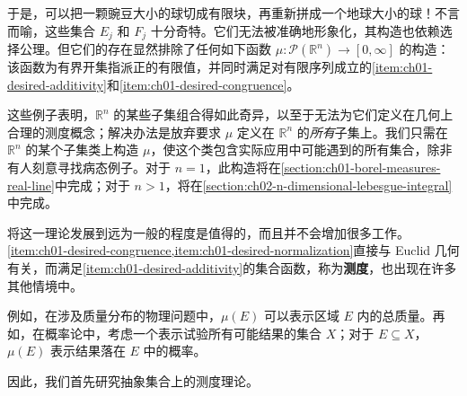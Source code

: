 \documentclass[../../main.tex]{subfiles}%
\begin{document}

\begin{remark}
于是，可以把一颗豌豆大小的球切成有限块，再重新拼成一个地球大小的球！不言而喻，这些集合 $E_j$ 和 $F_j$ 十分奇特。它们无法被准确地形象化，其构造也依赖选择公理。但它们的存在显然排除了任何如下函数 $\mu:\mathscr{P}(\mathbb{R}^n)\to[0,\infty]$ 的构造：该函数为有界开集指派正的有限值，并同时满足对有限序列成立的\cref{item:ch01-desired-additivity}和\cref{item:ch01-desired-congruence}。
\end{remark}


这些例子表明，$\mathbb{R}^n$ 的某些子集组合得如此奇异，以至于无法为它们定义在几何上合理的测度概念；解决办法是放弃要求 $\mu$ 定义在 $\mathbb{R}^n$ 的\emph{所有}子集上。我们只需在 $\mathbb{R}^n$ 的某个子集类上构造 $\mu$，使这个类包含实际应用中可能遇到的所有集合，除非有人刻意寻找病态例子。对于 $n=1$，此构造将在\cref{section:ch01-borel-measures-real-line}中完成；对于 $n>1$，将在\cref{section:ch02-n-dimensional-lebesgue-integral}中完成。

将这一理论发展到远为一般的程度是值得的，而且并不会增加很多工作。\cref{item:ch01-desired-congruence,item:ch01-desired-normalization}直接与 Euclid 几何有关，而满足\cref{item:ch01-desired-additivity}的集合函数，称为\textbf{测度}，也出现在许多其他情境中。
\begin{examples}\label{examples:ch01-abstract-measure-motivation}
例如，在涉及质量分布的物理问题中，$\mu(E)$ 可以表示区域 $E$ 内的总质量。再如，在概率论中，考虑一个表示试验所有可能结果的集合 $X$；对于 $E\subseteq X$，$\mu(E)$ 表示结果落在 $E$ 中的概率。
\end{examples}
因此，我们首先研究抽象集合上的测度理论。
\end{document}
